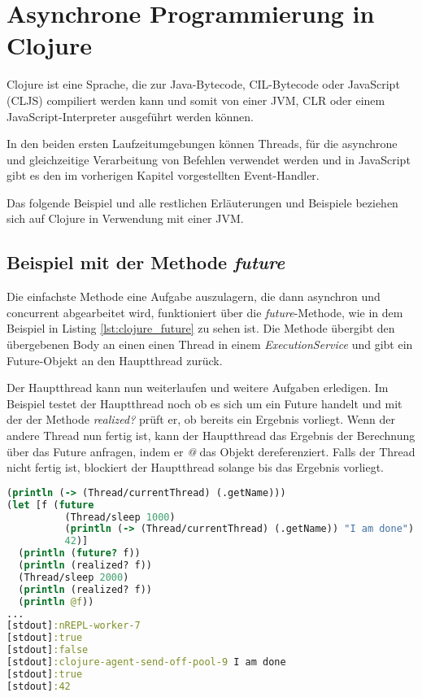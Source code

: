\section{Asynchrone Programmierung in Clojure}

Clojure ist eine Sprache, die zur Java-Bytecode, CIL-Bytecode oder JavaScript (\acl{CLJS}) compiliert werden kann und somit von einer \ac{JVM}, \ac{CLR} oder einem JavaScript-Interpreter ausgeführt werden können.

In den beiden ersten Laufzeitumgebungen können Threads, für die asynchrone und gleichzeitige Verarbeitung von Befehlen verwendet werden und in JavaScript gibt es den im vorherigen Kapitel vorgestellten Event-Handler.

Das folgende Beispiel und alle restlichen Erläuterungen und Beispiele beziehen sich auf Clojure in Verwendung mit einer \ac{JVM}.

\subsection*{Beispiel mit der Methode \textit{future}}
Die einfachste Methode eine Aufgabe auszulagern, die dann asynchron und concurrent abgearbeitet wird, funktioniert über die \textit{future}-Methode, wie in dem Beispiel in Listing \ref{lst:clojure_future} zu sehen ist. Die Methode übergibt den übergebenen Body an einen einen Thread in einem \textit{ExecutionService} und gibt ein Future-Objekt an den Hauptthread zurück.

Der Hauptthread kann nun weiterlaufen und weitere Aufgaben erledigen. Im Beispiel testet der Hauptthread noch ob es sich um ein Future handelt und mit der der Methode \textit{realized?} prüft er, ob bereits ein Ergebnis vorliegt. Wenn der andere Thread nun fertig ist, kann der Hauptthread das Ergebnis der Berechnung über das Future anfragen, indem er \textit{@} das Objekt dereferenziert. Falls der Thread nicht fertig ist, blockiert der Hauptthread solange bis das Ergebnis vorliegt.

\begin{lstlisting}[language=Clojure,caption=Das asynchrone Ausführen von Befehlen mit der Methode \textit{future},label=lst:clojure_future]
(println (-> (Thread/currentThread) (.getName)))
(let [f (future
          (Thread/sleep 1000)
          (println (-> (Thread/currentThread) (.getName)) "I am done")
          42)]
  (println (future? f))
  (println (realized? f))
  (Thread/sleep 2000)
  (println (realized? f))
  (println @f))
...
[stdout]:nREPL-worker-7
[stdout]:true
[stdout]:false
[stdout]:clojure-agent-send-off-pool-9 I am done
[stdout]:true
[stdout]:42
\end{lstlisting}


